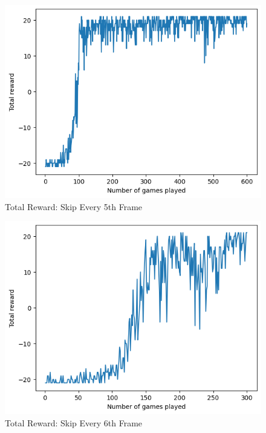 \documentclass[12pt, a4paper, twocolumn]{article} %
\begin{document}
\begin{figure}[H]
	\includegraphics[width=\linewidth]{tr_sk5.PNG} %
	\caption{Total Reward: Skip Every 5th Frame} %
\end{figure}

\begin{figure}[H]
	\includegraphics[width=\linewidth]{tr_sk6.PNG} %
	\caption{Total Reward: Skip Every 6th Frame} %
\end{figure}
\end{document}
